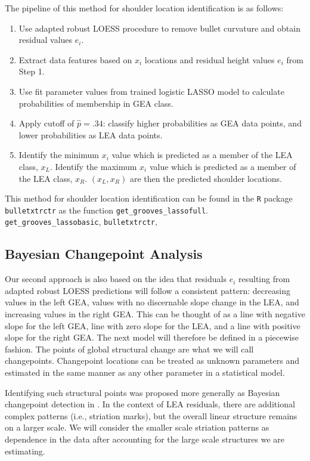 \documentclass[12pt]{article}
\begin{document}
The pipeline of this method for shoulder location identification is as
follows:

\begin{enumerate}
\item Use adapted robust LOESS procedure to remove bullet curvature and obtain residual values $e_i$.
\item Extract data features based on $x_i$ locations and residual height values $e_i$ from Step 1. 
\item Use fit parameter values from trained logistic LASSO model to calculate probabilities of membership in GEA class. 
\item Apply cutoff of $\hat{p} = .34$: classify higher probabilities as GEA data points, and lower probabilities as LEA data points.
\item Identify the minimum $x_i$ value which is predicted as a member of the LEA class, $x_{L}$. Identify the maximum $x_i$ value which is predicted as a member of the LEA class, $x_{R}$. $(x_L, x_R)$ are then the predicted shoulder locations.  
\end{enumerate}

This method for shoulder location identification can be found in the
\texttt{R} package \texttt{bulletxtrctr} as the function
\texttt{get\_grooves\_lassofull}. {\color{teal}{Another method,}}
\texttt{get\_grooves\_lassobasic},
{\color{teal}{is also available through}} \texttt{bulletxtrctr},
{\color{teal}{but is slightly less accurate and thus is not laid out here.}}

\subsection{Bayesian Changepoint Analysis}

Our second approach is also based on the idea that residuals \(e_i\)
resulting from adapted robust LOESS predictions will follow a consistent
pattern: decreasing values in the left GEA, values with no discernable
slope change in the LEA, and increasing values in the right GEA. This
can be thought of as a line with negative slope for the left GEA, line
with zero slope for the LEA, and a line with positive slope for the
right GEA. The next model will therefore be defined in a piecewise
fashion. The points of global structural change are what we will call
changepoints. Changepoint locations can be treated as unknown parameters
and estimated in the same manner as any other parameter in a statistical
model.

Identifying such structural points was proposed more generally as
Bayesian changepoint detection in \citep{stephens1994}. In the context
of LEA residuals, there are additional complex patterns (i.e., striation
marks), but the overall linear structure remains on a larger scale. We
will consider the smaller scale striation patterns as dependence in the
data after accounting for the large scale structures we are estimating.
\end{document}
